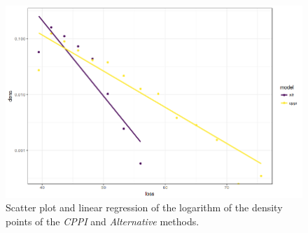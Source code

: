 \begin{figure}[h]
    \centering
    \includegraphics[scale=0.5]{images/lm_tails.png}
    \caption{Scatter plot and linear regression of the logarithm of the density points of the \textit{CPPI} and \textit{Alternative} methods.}
    \label{fig:lm-tails}
\end{figure}



